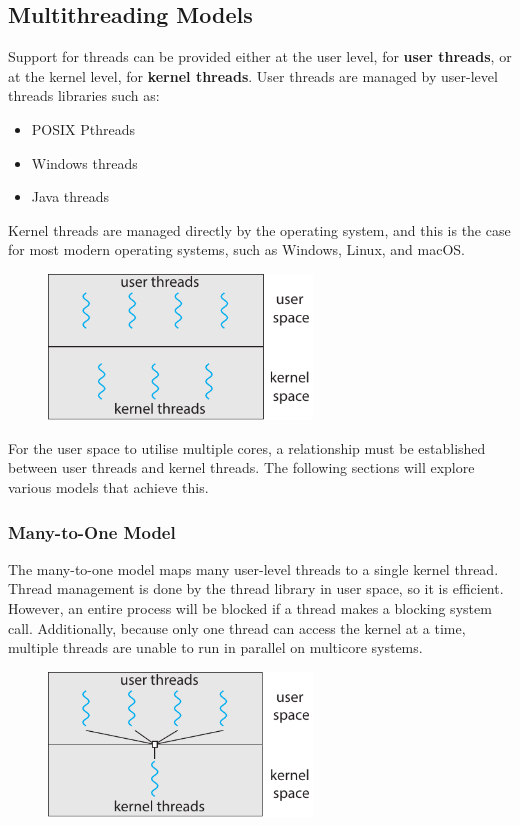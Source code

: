 \documentclass{article}
\begin{document}
\subsection{Multithreading Models}
Support for threads can be provided either at the user level, for
\textbf{user threads}, or at the kernel level, for \textbf{kernel
threads}. User threads are managed by user-level threads libraries such
as:
\begin{itemize}
    \item POSIX Pthreads
    \item Windows threads
    \item Java threads
\end{itemize}
Kernel threads are managed directly by the operating system, and this is
the case for most modern operating systems, such as Windows, Linux, and
macOS.\@
\begin{figure}[H]
    \centering
    \includegraphics[width = 7cm]{figures/threads_user_kernel.pdf}
\end{figure}
For the user space to utilise multiple cores, a relationship must be
established between user threads and kernel threads. The following
sections will explore various models that achieve this.
\subsubsection{Many-to-One Model}
The many-to-one model maps many user-level threads to a single kernel
thread. Thread management is done by the thread library in user space,
so it is efficient. However, an entire process will be blocked if a
thread makes a blocking system call. Additionally, because only one
thread can access the kernel at a time, multiple threads are unable to
run in parallel on multicore systems.
\begin{figure}[H]
    \centering
    \includegraphics[width = 7cm]{figures/threads_many_to_one.pdf}
\end{figure}
\end{document}
